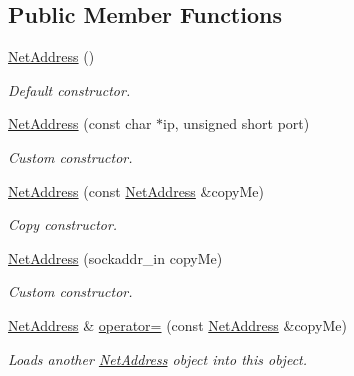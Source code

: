 \subsection*{Public Member Functions}
\begin{DoxyCompactItemize}
\item 
\hypertarget{class_net_address_ad1550c05b67de3a1a3113c2a760e5331}{
\hyperlink{class_net_address_ad1550c05b67de3a1a3113c2a760e5331}{NetAddress} ()}
\label{class_net_address_ad1550c05b67de3a1a3113c2a760e5331}

\begin{DoxyCompactList}\small\item\em Default constructor. \item\end{DoxyCompactList}\item 
\hyperlink{class_net_address_a6de5f2878e9e12e2861d706dcd9a0ee4}{NetAddress} (const char $\ast$ip, unsigned short port)
\begin{DoxyCompactList}\small\item\em Custom constructor. \item\end{DoxyCompactList}\item 
\hyperlink{class_net_address_a5ba35afc6d52b86db53511135ce54e85}{NetAddress} (const \hyperlink{class_net_address}{NetAddress} \&copyMe)
\begin{DoxyCompactList}\small\item\em Copy constructor. \item\end{DoxyCompactList}\item 
\hyperlink{class_net_address_ac65b94a94d09f8da940b215311695991}{NetAddress} (sockaddr\_\-in copyMe)
\begin{DoxyCompactList}\small\item\em Custom constructor. \item\end{DoxyCompactList}\item 
\hyperlink{class_net_address}{NetAddress} \& \hyperlink{class_net_address_adadc6cb5bad9ef164963bbd8836d8208}{operator=} (const \hyperlink{class_net_address}{NetAddress} \&copyMe)
\begin{DoxyCompactList}\small\item\em Loads another \hyperlink{class_net_address}{NetAddress} object into this object. \item\end{DoxyCompactList}\item 

\end{DoxyCompactItemize}

